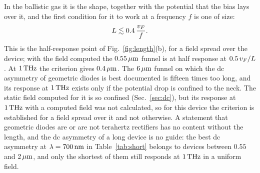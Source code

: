 In the ballistic gas it is the shape, together with the potential that the
bias lays over it, and the first condition for it to work at a frequency
$f$ is one of size:
\begin{equation}
L\lesssim0.4\,\frac{v_{F}}{f} .
\label{eq:criterion}
\end{equation}
This is the half-response point of Fig.~\ref{fig:length}(b), for a field
spread over the device; with the field computed the $0.55\,\mu\mathrm{m}$ funnel is at
half response at $0.5\,v_{F}/L$. At $1\,\mathrm{THz}$ the criterion gives $0.4\,\mu\mathrm{m}$.
The $6\,\mu\mathrm{m}$ funnel on which the dc asymmetry of geometric diodes is best
documented is fifteen times too long, and its response at $1\,\mathrm{THz}$ exists
only if the potential drop is confined to the neck. The static field
computed for it is so confined
(Sec.~\ref{sec:dc}), but its response at $1\,\mathrm{THz}$ with a computed field was
not calculated, so for this device the criterion is established for a
field spread over it and not otherwise. A statement that
geometric diodes are or are not terahertz rectifiers has no content
without the length, and the dc asymmetry of a long device is no guide: the
best dc asymmetry at $\lambda=700\,\mathrm{nm}$ in Table~\ref{tab:short} belongs to
devices between $0.55$ and $2\,\mu\mathrm{m}$, and only the shortest of them still
responds at $1\,\mathrm{THz}$ in a uniform field.

